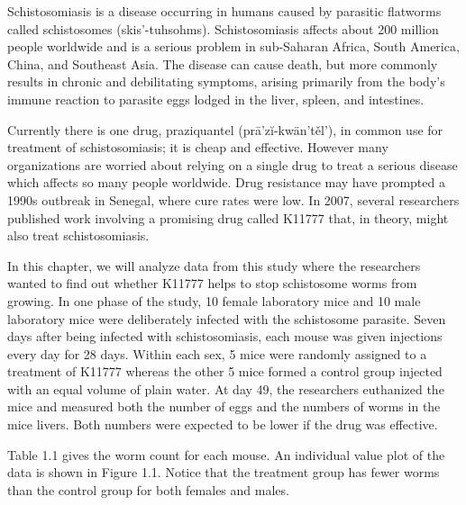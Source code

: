 \documentclass[
]{report}
\begin{document}
Schistosomiasis is a disease occurring in humans caused by parasitic flatworms called schistosomes (skis'-tuhsohms). Schistosomiasis affects about 200 million people worldwide and is a serious problem in sub-Saharan Africa, South America, China, and Southeast Asia. The disease can cause death, but more commonly results in chronic and debilitating symptoms, arising primarily from the body's immune reaction to parasite eggs lodged in the liver, spleen, and intestines.

Currently there is one drug, praziquantel (prā'zĭ-kwän'těl'), in common use for treatment of schistosomiasis; it is cheap and effective. However many organizations are worried about relying on a single drug to treat a serious disease which affects so many people worldwide. Drug resistance may have prompted a 1990s outbreak in Senegal, where cure rates were low. In 2007, several researchers published work involving a promising drug called K11777 that, in theory, might also treat schistosomiasis.

In this chapter, we will analyze data from this study where the researchers wanted to find out whether K11777 helps to stop schistosome worms from growing. In one phase of the study, 10 female laboratory mice and 10 male laboratory mice were deliberately infected with the schistosome parasite. Seven days after being infected with schistosomiasis, each mouse was given injections every day for 28 days. Within each sex, 5 mice were randomly assigned to a treatment of K11777 whereas the other 5 mice formed a control group injected with an equal volume of plain water. At day 49, the researchers euthanized the mice and measured both the number of eggs and the numbers of worms in the mice livers. Both numbers were expected to be lower if the drug was effective.

Table 1.1 gives the worm count for each mouse. An individual value plot of the data is shown in Figure 1.1. Notice that the treatment group has fewer worms than the control group for both females and males.
\end{document}
